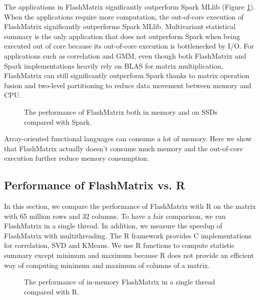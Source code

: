 The applications in FlashMatrix significantly outperform Spark MLlib (Figure
\ref{perf:fm}). When the applications require more computation, the out-of-core
execution of FlashMatrix significantly outperforms Spark MLlib. Multivariant
statistical summary is the only application that does not outperform Spark when
being executed out of core because its out-of-core execution is bottlenecked
by I/O. For applications such as correlation and GMM, even though both FlashMatrix
and Spark implementations heavily rely on BLAS for matrix multiplication,
FlashMatrix can still significantly outperform Spark thanks to matrix operation
fusion and two-level partitioning to reduce data movement between memory and CPU.

\begin{figure}
	\begin{center}
		\footnotesize
		
		\caption{The performance of FlashMatrix both in memory and on SSDs
		compared with Spark.}
		\label{perf:fm}
	\end{center}
\end{figure}

Array-oriented functional languages can consume a lot of memory. Here we show
that FlashMatrix actually doesn't consume much memory and the out-of-core
execution further reduce memory consumption.

\subsection{Performance of FlashMatrix vs. R}
In this section, we compare the performance of FlashMatrix with R on the matrix
with 65 million rows and 32 columns. To have
a fair comparison, we run FlashMatrix in a single thread. In addition, we
measure the speedup of FlashMatrix with multithreading. The R framework
provides C implementations for correlation, SVD and KMeans. We use R functions
to compute statistic summary except minimum and maximum
because R does not provide an efficient way of computing minimum and maximum
of columns of a matrix.


\begin{figure}
	\begin{center}
		\footnotesize
		
		\caption{The performance of in-memory FlashMatrix in a single thread
		compared with R.}
		\label{fig:fmR}
	\end{center}
\end{figure}

